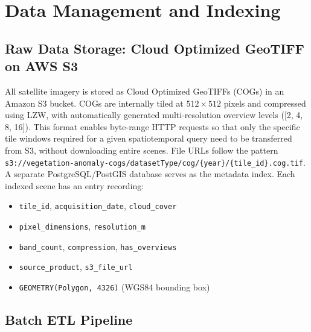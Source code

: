\section{Data Management and Indexing}

\subsection{Raw Data Storage: Cloud Optimized GeoTIFF on AWS S3}

All satellite imagery is stored as Cloud Optimized GeoTIFFs (COGs) in an Amazon S3 bucket. COGs are internally tiled at $512 \times 512$ pixels and compressed using LZW, with automatically generated multi-resolution overview levels ([2, 4, 8, 16]). This format enables byte-range HTTP requests so that only the specific tile windows required for a given spatiotemporal query need to be transferred from S3, without downloading entire scenes. File URLs follow the pattern \texttt{s3://vegetation-anomaly-cogs/datasetType/cog/\{year\}/\{tile\_id\}.cog.tif}. A separate PostgreSQL/PostGIS database serves as the metadata index. Each indexed scene has an entry recording:
\begin{itemize}
    \item \texttt{tile\_id}, \texttt{acquisition\_date}, \texttt{cloud\_cover}
    \item \texttt{pixel\_dimensions}, \texttt{resolution\_m}
    \item \texttt{band\_count}, \texttt{compression}, \texttt{has\_overviews}
    \item \texttt{source\_product}, \texttt{s3\_file\_url}
    \item \texttt{GEOMETRY(Polygon, 4326)} (WGS84 bounding box)
\end{itemize}

\subsection{Batch ETL Pipeline}

